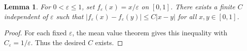 \documentclass{article}
\newtheorem{lemma}{Lemma}
\begin{document}
\begin{lemma}\label{lem:uniform}
For $0<\varepsilon\le1$, set $f_\varepsilon(x)=x/\varepsilon$ on $[0,1]$.
There exists a finite $C$ independent of $\varepsilon$ such that
$|f_\varepsilon(x)-f_\varepsilon(y)|\le C|x-y|$ for all $x,y\in[0,1]$.
\end{lemma}
\begin{proof}
For each fixed $\varepsilon$, the mean value theorem gives this inequality
with $C_\varepsilon=1/\varepsilon$. Thus the desired $C$ exists.
\end{proof}
\end{document}
